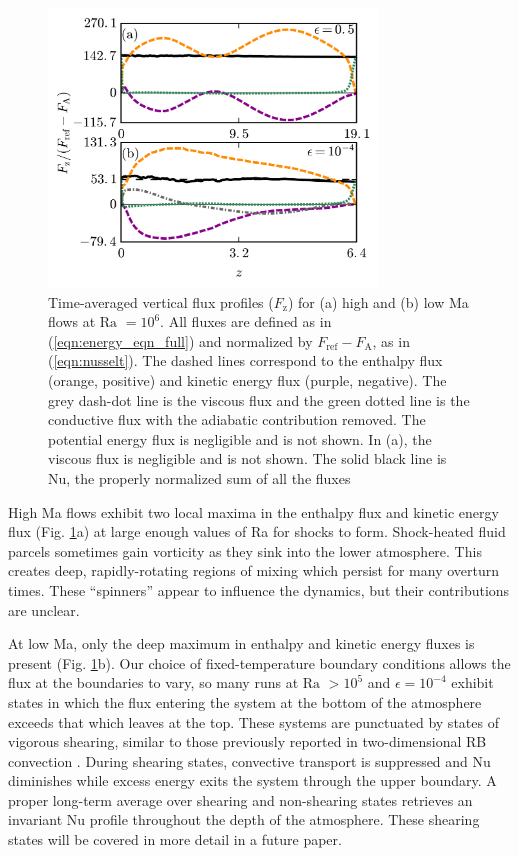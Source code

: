 \documentclass[aps, prl, twocolumn, nofootinbib, groupedaddress, amsfonts, amssymb, amsmath]{revtex4-1}
\begin{document}
\begin{figure}[t]
\includegraphics[width=3.4375in]{./figs/fluxes_fig.png}
\caption{Time-averaged vertical flux profiles ($F_{\text{z}}$)
for (a) high and (b) low Ma flows at $\text{Ra }= 10^6$.  
All fluxes are defined as in (\ref{eqn:energy_eqn_full}) and 
normalized by $F_{\text{ref}} - F_{\text{A}}$, as in (\ref{eqn:nusselt}).
The dashed lines correspond to the
enthalpy flux (orange, positive) and kinetic energy flux (purple, negative).  
The grey dash-dot line is the
viscous flux and the green dotted line is the conductive flux with the 
adiabatic contribution removed. The potential energy flux is negligible and is not shown.
In (a), the viscous flux is negligible and is not shown.  The solid black line is
Nu, the properly normalized sum of all the fluxes \label{fig:flux_profiles} }
\end{figure}

High Ma flows exhibit two 
local maxima in the enthalpy flux and kinetic energy flux (Fig. \ref{fig:flux_profiles}a)
at large enough values of Ra for shocks to form.
Shock-heated fluid parcels sometimes gain vorticity as
they sink into the lower atmosphere.
This creates deep, rapidly-rotating regions
of mixing which persist for many overturn times. These ``spinners'' appear to
influence the dynamics, but their contributions are unclear.

At low Ma, only the deep maximum in enthalpy and kinetic energy fluxes
is present (Fig. \ref{fig:flux_profiles}b).  
Our choice of fixed-temperature boundary conditions allows the flux at the 
boundaries to vary, so many runs at $\text{Ra }> 10^5$
and $\epsilon = 10^{-4}$ exhibit states in which the flux 
entering the system at the bottom of the atmosphere 
exceeds that which leaves at the top.  
These systems are punctuated by states of vigorous shearing, similar to those previously
reported in two-dimensional RB convection \cite{goluskin&all2014}.  
During shearing states, convective transport is suppressed and Nu diminishes while
excess energy exits the system through the upper boundary.
A proper long-term average over shearing
and non-shearing states retrieves an invariant Nu profile throughout the depth
of the atmosphere. 
These shearing states will be covered in more detail in a future paper. 
\end{document}
